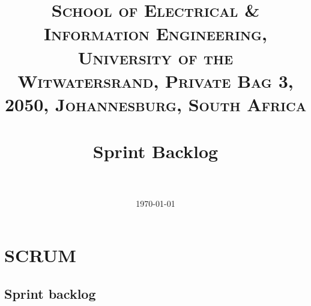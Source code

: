 \documentclass[paper=a4, fontsize=11pt]{scrartcl} %
\title{	
\normalfont \normalsize 
\textsc{School of Electrical \& Information Engineering, University of the
Witwatersrand, Private Bag 3, 2050, Johannesburg, South Africa} \\ [25pt] %
\horrule{0.5pt} \\[0.4cm] %
\huge Sprint Backlog \\ %
\horrule{2pt} \\[0.5cm] %
}
\author{} %
\date{\normalsize\today} %
\numberwithin{equation}{section} %
\numberwithin{figure}{section} %
\numberwithin{table}{section} %
\begin{document}
\maketitle %



\newpage
\section{SCRUM}
\subsection{Sprint backlog}
\end{document}
